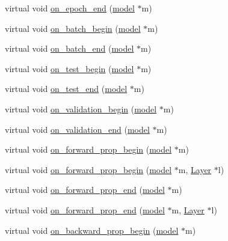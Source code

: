 \begin{DoxyCompactItemize}
\item 
virtual void \hyperlink{classlbann_1_1lbann__callback_a1fc71110e7f754bf73c9e0f344a448a5}{on\+\_\+epoch\+\_\+end} (\hyperlink{classlbann_1_1model}{model} $\ast$m)
\item 
virtual void \hyperlink{classlbann_1_1lbann__callback_a9ecf4e44cd4021cdd687de14c850cc83}{on\+\_\+batch\+\_\+begin} (\hyperlink{classlbann_1_1model}{model} $\ast$m)
\item 
virtual void \hyperlink{classlbann_1_1lbann__callback_a895ca577e358601fcae5c04749f60535}{on\+\_\+batch\+\_\+end} (\hyperlink{classlbann_1_1model}{model} $\ast$m)
\item 
virtual void \hyperlink{classlbann_1_1lbann__callback_a716bff45bdc5a88eed09c2231f5bc93a}{on\+\_\+test\+\_\+begin} (\hyperlink{classlbann_1_1model}{model} $\ast$m)
\item 
virtual void \hyperlink{classlbann_1_1lbann__callback_accbad4dd004c1ced33642db6398b2efe}{on\+\_\+test\+\_\+end} (\hyperlink{classlbann_1_1model}{model} $\ast$m)
\item 
virtual void \hyperlink{classlbann_1_1lbann__callback_a2bde303671110519388d9962bc3e5583}{on\+\_\+validation\+\_\+begin} (\hyperlink{classlbann_1_1model}{model} $\ast$m)
\item 
virtual void \hyperlink{classlbann_1_1lbann__callback_adc16e42e5064dc2dc8d84dfbfc1325eb}{on\+\_\+validation\+\_\+end} (\hyperlink{classlbann_1_1model}{model} $\ast$m)
\item 
virtual void \hyperlink{classlbann_1_1lbann__callback_a22ed977371173105b4aad3a20b9c59dc}{on\+\_\+forward\+\_\+prop\+\_\+begin} (\hyperlink{classlbann_1_1model}{model} $\ast$m)
\item 
virtual void \hyperlink{classlbann_1_1lbann__callback_ab96adb1d77180e00fdd668cd381323fd}{on\+\_\+forward\+\_\+prop\+\_\+begin} (\hyperlink{classlbann_1_1model}{model} $\ast$m, \hyperlink{classlbann_1_1Layer}{Layer} $\ast$l)
\item 
virtual void \hyperlink{classlbann_1_1lbann__callback_a79a0bb407852d7b330b74373647ffe46}{on\+\_\+forward\+\_\+prop\+\_\+end} (\hyperlink{classlbann_1_1model}{model} $\ast$m)
\item 
virtual void \hyperlink{classlbann_1_1lbann__callback_a5eff0a59fbce98a981d9cdd0547a3ad5}{on\+\_\+forward\+\_\+prop\+\_\+end} (\hyperlink{classlbann_1_1model}{model} $\ast$m, \hyperlink{classlbann_1_1Layer}{Layer} $\ast$l)
\item 
virtual void \hyperlink{classlbann_1_1lbann__callback_a2c0709a26179d115ff85b7561786ee27}{on\+\_\+backward\+\_\+prop\+\_\+begin} (\hyperlink{classlbann_1_1model}{model} $\ast$m)

\end{DoxyCompactItemize}
